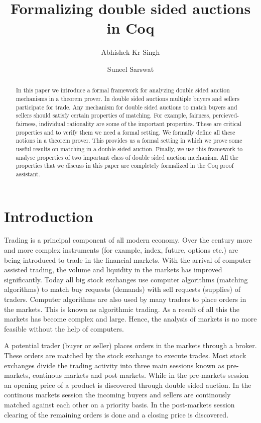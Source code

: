 \documentclass[a4paper,UKenglish,cleveref, autoref]{lipics-v2019}
\title{Formalizing double sided auctions in Coq} %
\author{Abhishek Kr Singh}{Tata Institute of Fundamental Research, India} {abhishek.uor@gmail.com}
{}{}
\author{Suneel Sarswat}{Tata Institute of Fundamental Research, India} {suneel.sarswat@gmail.com}
{}{}
\begin{document}
\newcommand{\tw}{\texttt}

\maketitle

\begin{abstract}

In this paper we introduce a formal framework for analyzing double sided auction mechanisms in a theorem prover. In double sided auctions multiple buyers and sellers participate for trade. Any mechanism for double sided auctions to match buyers and sellers should satisfy certain properties of matching. For example, fairness, percieved-fairness, individual rationality are some of the important properties. These are critical properties and to verify them we need a formal setting. We formally define all these notions in a theorem prover. This provides us a  formal setting in which we prove some useful results on matching in a double sided auction. Finally, we use this framework to analyse properties of two important class of double sided auction mechanism. All the properties that we discuss in this paper are completely formalized in the Coq proof assistant.  
\end{abstract}

\section{Introduction}
\label{section1}

Trading is a principal component of all modern economy. Over the century more and more complex instruments (for example, index, future, options etc.) are being introduced to trade in the financial markets. With the arrival of computer assisted trading, the volume and liquidity in the markets has improved significantly. Today all big stock exchanges use computer algorithms (matching algorithms) to match buy requests (demands) with sell requests (supplies) of traders. Computer algorithms are also used by many traders to place orders  in the markets. This is known as algorithmic trading.  As a result of all this the markets has become complex and large. Hence, the analysis of markets is no more feasible without the help of computers. 

A potential trader (buyer or seller) places orders in the markets through a broker. These orders are matched by the stock exchange to execute trades. Most stock exchanges divide the trading activity into three main sessions known as pre-markets, continous markets and post markets. While in the pre-markets session an opening price of a product is discovered through double sided auction. In the continous markets session the incoming buyers and sellers are continously matched against each other on a priority basis. In the post-markets session clearing of the remaining orders is done and a closing price is discovered.
\end{document}
